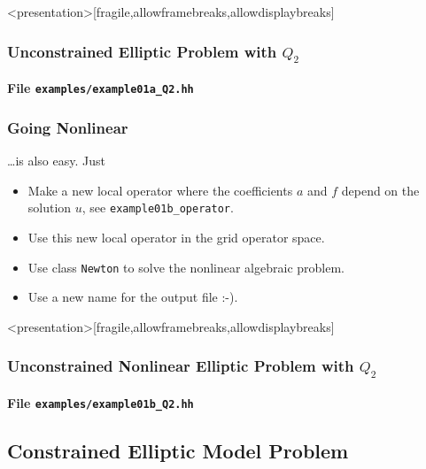 \begin{frame}<presentation>[fragile,allowframebreaks,allowdisplaybreaks]
\frametitle<presentation>{Unconstrained Elliptic Problem with $Q_2$}
\framesubtitle<presentation>{File \texttt{examples/example01a\_Q2.hh}}

\end{frame}


\begin{frame}
\frametitle{Going Nonlinear}
\ldots is also easy. Just 
\begin{itemize}
\item Make a new local operator where the coefficients $a$ and $f$ depend on the solution $u$,
see \lstinline{example01b_operator}.
\item Use this new local operator in the grid operator space.
\item Use class \lstinline{Newton} to solve the nonlinear algebraic problem.
\item Use a new name for the output file :-).
\end{itemize}
\end{frame}

\begin{frame}<presentation>[fragile,allowframebreaks,allowdisplaybreaks]
\frametitle<presentation>{Unconstrained Nonlinear Elliptic Problem with $Q_2$}
\framesubtitle<presentation>{File \texttt{examples/example01b\_Q2.hh}}

\end{frame}


\subsection{Constrained Elliptic Model Problem}

